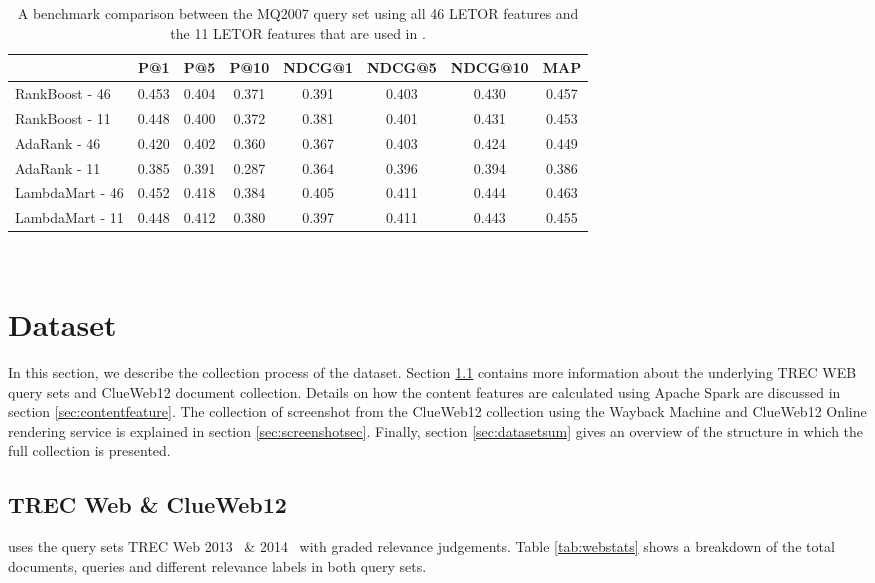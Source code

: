
\begin{table}[t]
\caption{A benchmark comparison between the MQ2007 query set using all 46 LETOR features and the 11 LETOR features that are used in \datasetname.}
\label{tab:11vs46}
\centering
\begin{tabular}{lccccccc}
\toprule
           & P@1    & P@5    & P@10   & NDCG@1 & NDCG@5 & NDCG@10 & MAP    \\ 
\midrule
RankBoost - 46  & 0.453 & 0.404 & 0.371 & 0.391 & 0.403 & 0.430  & 0.457 \\
RankBoost - 11 & 0.448 & 0.400 & 0.372 & 0.381  & 0.401  & 0.431   & 0.453 \\
\midrule
AdaRank - 46  & 0.420 & 0.402 & 0.360 & 0.367 & 0.403 & 0.424  & 0.449 \\
AdaRank - 11  & 0.385 & 0.391 & 0.287 & 0.364  & 0.396  & 0.394   & 0.386 \\ 
\midrule
LambdaMart - 46 & 0.452 & 0.418 & 0.384 & 0.405 & 0.411 & 0.444  & 0.463 \\
LambdaMart - 11 & 0.448 & 0.412 & 0.380 & 0.397  & 0.411  & 0.443   & 0.455 \\
\bottomrule
\end{tabular}
\\
\label{tab:11vs46}
\end{table}


\section{Dataset}\label{sec:dataset}
In this section, we describe the collection process of the \datasetname dataset. Section \ref{sec:trecclue} contains more information about the underlying TREC WEB query sets and ClueWeb12 document collection. Details on how the content features are calculated using Apache Spark are discussed in section \ref{sec:contentfeature}. The collection of screenshot from the ClueWeb12 collection using the Wayback Machine and ClueWeb12 Online rendering service is explained in section \ref{sec:screenshotsec}. Finally, section \ref{sec:datasetsum} gives an overview of the structure in which the full collection is presented.

\subsection{TREC Web \& ClueWeb12 }\label{sec:trecclue}
\datasetname uses the query sets TREC Web 2013~\cite{collins2013trec} \& 2014~\cite{collins2015trec} with graded relevance judgements. Table \ref{tab:webstats} shows a breakdown of the total documents, queries and different relevance labels in both query sets. 

